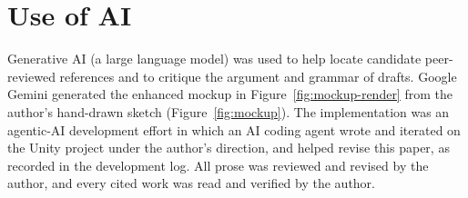 \documentclass[sigconf,nonacm]{acmart}
\begin{document}
\section*{Use of AI}
Generative AI (a large language model) was used to help locate candidate peer-reviewed
references and to critique the argument and grammar of drafts. Google Gemini generated the
enhanced mockup in Figure~\ref{fig:mockup-render} from the author's hand-drawn sketch
(Figure~\ref{fig:mockup}). The implementation was an agentic-AI development effort in which an
AI coding agent wrote and iterated on the Unity project under the author's direction, and helped
revise this paper, as recorded in the development log. All prose was reviewed and revised by the
author, and every cited work was read and verified by the author.



\end{document}
